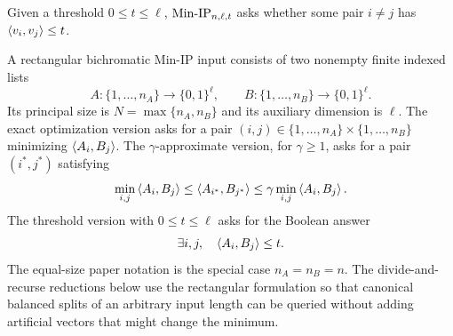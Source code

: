 \begin{definition}
  \label{def:min-ip-decision}
  Given a threshold $0\leq t\leq\ell$, $\mathrm{Min\mbox{-}IP}_{n,\ell,t}$ asks whether some
  pair $i\neq j$ has $\left\langle v_i,v_j\right\rangle\leq t$.
\end{definition}

\begin{definition}
  \label{def:bichromatic-min-ip}
  A rectangular bichromatic Min-IP input consists of two nonempty finite
  indexed lists
  \[
    A:\{1,\ldots,n_A\}\to\{0,1\}^{\ell},\qquad
    B:\{1,\ldots,n_B\}\to\{0,1\}^{\ell}.
  \]
  Its principal size is $N=\max\{n_A,n_B\}$ and its auxiliary dimension is
  $\ell$.  The exact optimization version asks for a pair
  $(i,j)\in\{1,\ldots,n_A\}\times\{1,\ldots,n_B\}$ minimizing
  $\left\langle A_i,B_j\right\rangle$.  The $\gamma$-approximate version, for $\gamma\geq1$, asks
  for a pair $(i^*,j^*)$ satisfying
  \[
    \min_{i,j}\left\langle A_i,B_j\right\rangle
    \leq \left\langle A_{i^*},B_{j^*}\right\rangle
    \leq \gamma\min_{i,j}\left\langle A_i,B_j\right\rangle.
  \]
  The threshold version with $0\leq t\leq\ell$ asks for the Boolean answer
  \[
    \exists i,j,\quad \left\langle A_i,B_j\right\rangle\leq t.
  \]
  The equal-size paper notation is the special case $n_A=n_B=n$.  The
  divide-and-recurse reductions below use the rectangular formulation so that
  canonical balanced splits of an arbitrary input length can be queried
  without adding artificial vectors that might change the minimum.
\end{definition}

